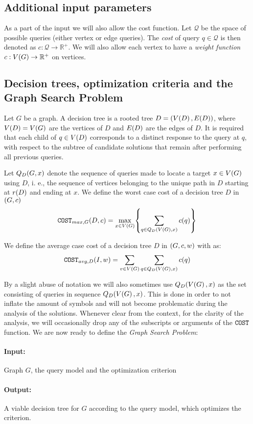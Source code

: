 \subsection{Additional input parameters}
As a part of the input we will also allow the cost function. Let $\mathcal{Q}$ be the space of possible queries (either vertex or edge queries). The \textit{cost} of query $q\in\mathcal{Q}$ is then denoted
as $c:\mathcal{Q}\to \mathbb{R}^+$. We will also allow each vertex to have a \textit{weight function} $c:V\mathopen{}\left( G \right)\to \mathbb{R}^+$ on vertices.
\subsection{Decision trees, optimization criteria and the Graph Search Problem}
Let $G$ be a graph. A decision tree is a rooted tree $D=(V\mathopen{}\left( D \right), E\mathopen{}\left( D \right))$, where $V\mathopen{}\left( D \right)=V\mathopen{}\left( G \right)$ are the vertices of $D$ and $E\mathopen{}\left( D \right)$ are the edges of $D$. It is required that each child of $q\in V\mathopen{}\left( D \right)$ corresponds to a distinct response to the query at $q$, with respect to the subtree of candidate solutions that remain after performing all previous queries. 

Let $Q_D\mathopen{}\left( G,x \right)$ denote the sequence of queries made to locate a target $x \in V\mathopen{}\left( G \right)$ using $D$, i. e., the sequence of vertices belonging to the unique path in $D$ starting at $r\mathopen{}\left( D \right)$ and ending at $x$. We define the worst case cost of a decision tree $D$ in $\mathopen{}\left( G,c \right)$
$$
\texttt{COST}_{max, G}\mathopen{}\left( D, c \right) = \max_{x\in V\mathopen{}\left( G \right)} \mathopen{}\left\{ \sum_{q\in Q_D\mathopen{}\left( V\mathopen{}\left( G \right),x \right)}c\mathopen{}\left( q \right) \right\}
$$

We define the average case cost of a decision tree $D$ in $\mathopen{}\left( G,c,w \right)$ with as:
$$
\texttt{COST}_{avg, D}\mathopen{}\left( I, w \right) = \sum_{v\in V\mathopen{}\left( G \right)}\sum_{q\in Q_D\mathopen{}\left( V\mathopen{}\left( G \right),x \right)}c\mathopen{}\left( q \right)
$$

By a slight abuse of notation we will also sometimes use $Q_D\mathopen{}\left( V\mathopen{}\left( G \right),x \right)$ as the set consisting of queries in sequence $Q_D\mathopen{}\left( V\mathopen{}\left( G \right),x \right)$. This is done in order to not inflate the amount of symbols and will not become problematic during the analysis of the solutions.
Whenever clear from the context, for the clarity of the analysis, we will occasionally drop any of the subscripts or arguments of the $\texttt{COST}$ function.
We are now ready to define the \textit{Graph Search Problem}:

\begin{tcolorbox}[colback=white, title=Generalized Search Problem, fonttitle=\bfseries, breakable]
\paragraph{Input:} Graph $G$, the query model and the optimization criterion
\paragraph{Output:} A viable decision tree for $G$ according to the query model, which optimizes the criterion.
\end{tcolorbox}